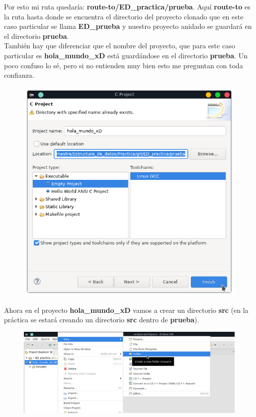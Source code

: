 \documentclass{article}
\begin{document}
\newpage

Por esto mi ruta quedaría: \textbf{route-to/ED\_practica/prueba}. Aquí
\textbf{route-to} es la ruta hasta donde se encuentra el directorio del proyecto
clonado que en este caso particular se llama \textbf{ED\_prueba} y nuestro
proyecto anidado se guardará en el directorio \textbf{prueba}.\\

También hay que diferenciar que el nombre del proyecto, que para este caso
particular es \textbf{hola\_mundo\_xD} está guardándose en el directorio
\textbf{prueba}. Un poco confuso lo sé, pero si no entienden muy bien esto me
preguntan con toda confianza.

\begin{figure}[h!]
  \centering
  \includegraphics[scale=0.75]{./Pictures/023_new_project.png}
\end{figure}

Ahora en el proyecto \textbf{hola\_mundo\_xD} vamos a crear un directorio
\textbf{src} (en la práctica se estará creando un directorio \textbf{src}
dentro de \textbf{prueba}).

\begin{figure}[h!]
  \centering
  \includegraphics[scale=0.65]{./Pictures/024_hola_mundo_xD_dir.png}
\end{figure}
\end{document}
